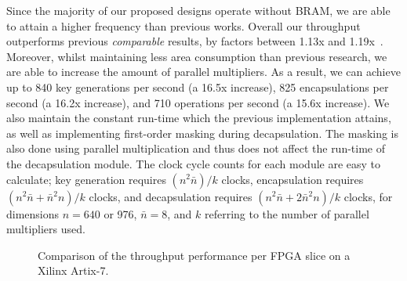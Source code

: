 Since the majority of our proposed designs operate without BRAM, we are able to attain a higher frequency than previous works. Overall our throughput outperforms previous \emph{comparable} results, by factors between 1.13x and 1.19x~\cite{howe2018standard}. Moreover, whilst maintaining less area consumption than previous research, we are able to increase the amount of parallel multipliers. As a result, we can achieve up to 840 key generations per second (a 16.5x increase), 825 encapsulations per second (a 16.2x increase), and 710 operations per second (a 15.6x increase). We also maintain the constant run-time which the previous implementation attains, as well as implementing first-order masking during decapsulation. The masking is also done using parallel multiplication and thus does not affect the run-time of the decapsulation module. The clock cycle counts for each module are easy to calculate; key generation requires $ (n^2\bar{n}) / k$ clocks, encapsulation requires $ (n^2\bar{n} + \bar{n}^2n)/k $ clocks, and decapsulation requires $(n^2\bar{n} + 2\bar{n}^2n)/k$ clocks, for dimensions $n=640$ or 976, $\bar{n}=8$, and $k$ referring to the number of parallel multipliers used.

\begin{figure}
\centering
    \advance\leftskip-1cm
\resizebox{\columnwidth}{!}{
}
\caption{Comparison of the throughput performance per FPGA slice on a Xilinx Artix-7.}
 \label{fig:hw_line}
\end{figure}